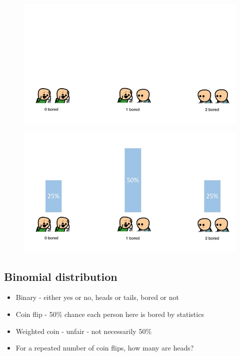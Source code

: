 \documentclass[]{article}
\begin{document}
{{{{{{{{\begin{figure}
\centering
\includegraphics{images/Slide2.jpeg}
\caption{}
\end{figure}

\begin{figure}
\centering
\includegraphics{images/Slide3.jpeg}
\caption{}
\end{figure}

\subsection{Binomial distribution}\label{binomial-distribution}

\begin{itemize}
\item
  Binary - either yes or no, heads or tails, bored or not
\item
  Coin flip - 50\% chance each person here is bored by statistics
\item
  Weighted coin - unfair - not necessarily 50\%
\item
  For a repeated number of coin flips, how many are heads?
\end{itemize}

}}}}}}}}
\end{document}
